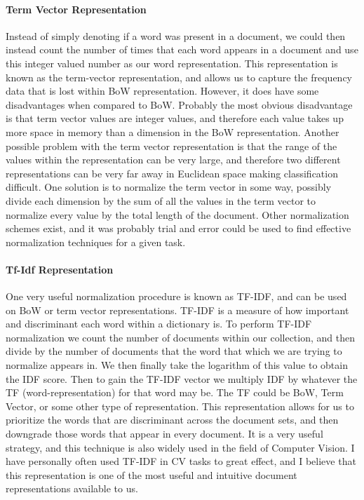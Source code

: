 \documentclass[paper=a4, fontsize=11pt]{scrartcl} %
\numberwithin{equation}{section} %
\numberwithin{figure}{section} %
\numberwithin{table}{section} %
\begin{document}
\paragraph{Term Vector Representation}
Instead of simply denoting if a word was present in a document, we could then instead count the number of times that each word appears in a document and use this integer valued number as our word representation.  
This representation is known as the term-vector representation, and allows us to capture the frequency data that is lost within BoW representation.  
However, it does have some disadvantages when compared to BoW.  
Probably the most obvious disadvantage is that term vector values are integer values, and therefore each value takes up more space in memory than a dimension in the BoW representation.  
Another possible problem with the term vector representation is that the range of the values within the representation can be very large, and therefore two different representations can be very far away in Euclidean space making classification difficult.  
One solution is to normalize the term vector in some way, possibly divide each dimension by the sum of all the values in the term vector to normalize every value by the total length of the document.  
Other normalization schemes exist, and it was probably trial and error could be used to find effective normalization techniques for a given task.

\paragraph{Tf-Idf Representation}
One very useful normalization procedure is known as TF-IDF, and can be used on BoW or term vector representations.  
TF-IDF is a measure of how important and discriminant each word within a dictionary is.  
To perform TF-IDF normalization we count the number of documents within our collection, and then divide by the number of documents that the word that which we are trying to normalize appears in.  
We then finally take the logarithm of this value to obtain the IDF score.  
Then to gain the TF-IDF vector we multiply IDF by whatever the TF (word-representation) for that word may be.  
The TF could be BoW, Term Vector, or some other type of representation.  
This representation allows for us to prioritize the words that are discriminant across the document sets, and then downgrade those words that appear in every document.  
It is a very useful strategy, and this technique is also widely used in the field of Computer Vision.  I have personally often used TF-IDF in CV tasks to great effect, and I believe that this representation is one of the most useful and intuitive document representations available to us.
\end{document}

